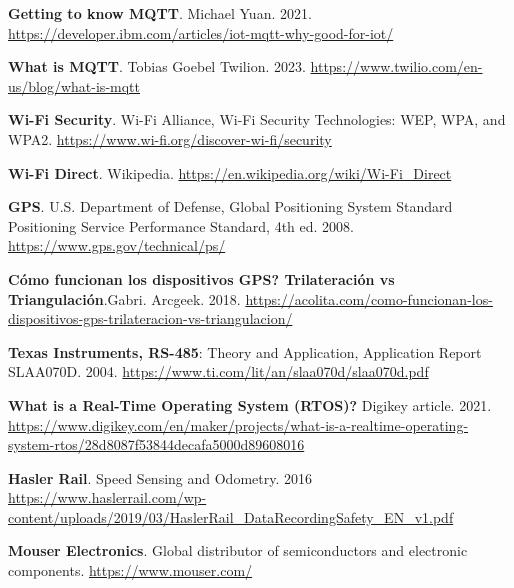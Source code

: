 \begin{thebibliography}{30}
\textbf{Getting to know MQTT}. Michael Yuan. 2021. \href{https://developer.ibm.com/articles/iot-mqtt-why-good-for-iot/}{https://developer.ibm.com/articles/iot-mqtt-why-good-for-iot/}

\textbf{What is MQTT}. Tobias Goebel
Twilion. 2023. \href{https://www.twilio.com/en-us/blog/what-is-mqtt}{https://www.twilio.com/en-us/blog/what-is-mqtt}


\textbf{Wi-Fi Security}. Wi-Fi Alliance, Wi-Fi Security Technologies: WEP, WPA, and WPA2. \href{https://www.wi-fi.org/discover-wi-fi/security}{https://www.wi-fi.org/discover-wi-fi/security}

\textbf{Wi-Fi Direct}. Wikipedia. \href{https://en.wikipedia.org/wiki/Wi-Fi_Direct}{https://en.wikipedia.org/wiki/Wi-Fi\_Direct}


\textbf{GPS}. U.S. Department of Defense, Global Positioning System Standard Positioning Service Performance Standard, 4th ed. 2008. \href{https://www.gps.gov/technical/ps/}{https://www.gps.gov/technical/ps/}

\textbf{Cómo funcionan los dispositivos GPS? Trilateración vs Triangulación}.Gabri. Arcgeek. 2018.  \href{https://acolita.com/como-funcionan-los-dispositivos-gps-trilateracion-vs-triangulacion/}{https://acolita.com/como-funcionan-los-dispositivos-gps-trilateracion-vs-triangulacion/}



\textbf{Texas Instruments, RS-485}: Theory and Application, Application Report SLAA070D. 2004. \href{https://www.ti.com/lit/an/slaa070d/slaa070d.pdf}{https://www.ti.com/lit/an/slaa070d/slaa070d.pdf}

\textbf{What is a Real-Time Operating System (RTOS)?} Digikey article. 2021. \href{https://www.digikey.com/en/maker/projects/what-is-a-realtime-operating-system-rtos/28d8087f53844decafa5000d89608016}{https://www.digikey.com/en/maker/projects/what-is-a-realtime-operating-system-rtos/28d8087f53844decafa5000d89608016}



\textbf{Hasler Rail}. Speed Sensing and Odometry. 2016
\href{https://www.haslerrail.com/wp-content/uploads/2019/03/HaslerRail_DataRecordingSafety_EN_v1.pdf}{https://www.haslerrail.com/wp-content/uploads/2019/03/HaslerRail\_DataRecordingSafety\_EN\_v1.pdf}

\textbf{Mouser Electronics}.  Global distributor of semiconductors and electronic components. \href{https://www.mouser.com/}{https://www.mouser.com/}


\end{thebibliography}
